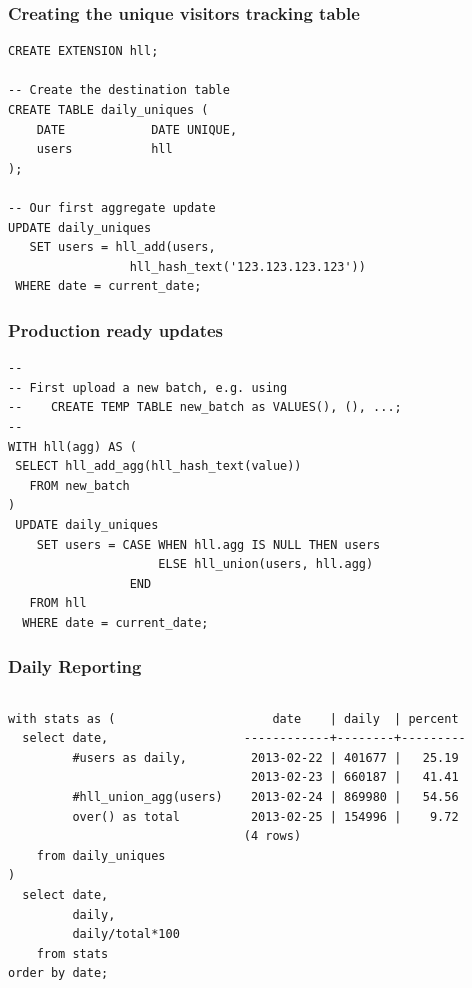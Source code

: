 \documentclass{beamer}
\begin{document}
\begin{frame}[fragile]
  \frametitle{Creating the unique visitors tracking table}

\begin{verbatim}
CREATE EXTENSION hll;

-- Create the destination table
CREATE TABLE daily_uniques (
    DATE            DATE UNIQUE,
    users           hll
);

-- Our first aggregate update
UPDATE daily_uniques
   SET users = hll_add(users,
                 hll_hash_text('123.123.123.123'))
 WHERE date = current_date;
\end{verbatim}  
\end{frame}

\begin{frame}[fragile]
  \frametitle{Production ready updates}

\begin{verbatim}
--
-- First upload a new batch, e.g. using
--    CREATE TEMP TABLE new_batch as VALUES(), (), ...;
--
WITH hll(agg) AS (
 SELECT hll_add_agg(hll_hash_text(value))
   FROM new_batch
)
 UPDATE daily_uniques
    SET users = CASE WHEN hll.agg IS NULL THEN users
                     ELSE hll_union(users, hll.agg)
                 END
   FROM hll
  WHERE date = current_date;
\end{verbatim}  
\end{frame}

\begin{frame}[fragile]
  \frametitle{Daily Reporting}

\begin{columns}
\begin{verbatim}
with stats as (
  select date,
         #users as daily,

         #hll_union_agg(users)
         over() as total

    from daily_uniques
)
  select date,
         daily,
         daily/total*100
    from stats
order by date;
\end{verbatim}  
\begin{verbatim}
    date    | daily  | percent 
------------+--------+---------
 2013-02-22 | 401677 |   25.19
 2013-02-23 | 660187 |   41.41
 2013-02-24 | 869980 |   54.56
 2013-02-25 | 154996 |    9.72
(4 rows)
\end{verbatim}  
\end{columns}
\end{frame}
\end{document}
